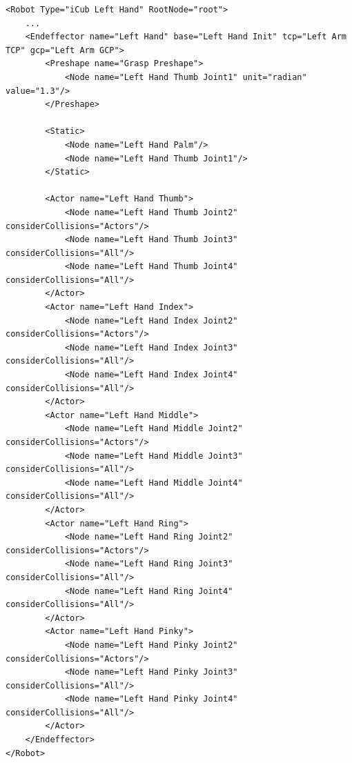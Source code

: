 \documentclass{book}
\begin{document}
\begin{lstlisting}
<Robot Type="iCub Left Hand" RootNode="root">
    ...
    <Endeffector name="Left Hand" base="Left Hand Init" tcp="Left Arm TCP" gcp="Left Arm GCP">
        <Preshape name="Grasp Preshape">
            <Node name="Left Hand Thumb Joint1" unit="radian" value="1.3"/>
        </Preshape>

        <Static>
            <Node name="Left Hand Palm"/>
            <Node name="Left Hand Thumb Joint1"/>
        </Static>

        <Actor name="Left Hand Thumb">
            <Node name="Left Hand Thumb Joint2" considerCollisions="Actors"/>
            <Node name="Left Hand Thumb Joint3" considerCollisions="All"/>
            <Node name="Left Hand Thumb Joint4" considerCollisions="All"/>
        </Actor>
        <Actor name="Left Hand Index">
            <Node name="Left Hand Index Joint2" considerCollisions="Actors"/>
            <Node name="Left Hand Index Joint3" considerCollisions="All"/>
            <Node name="Left Hand Index Joint4" considerCollisions="All"/>
        </Actor>
        <Actor name="Left Hand Middle">
            <Node name="Left Hand Middle Joint2" considerCollisions="Actors"/>
            <Node name="Left Hand Middle Joint3" considerCollisions="All"/>
            <Node name="Left Hand Middle Joint4" considerCollisions="All"/>
        </Actor>
        <Actor name="Left Hand Ring">
            <Node name="Left Hand Ring Joint2" considerCollisions="Actors"/>
            <Node name="Left Hand Ring Joint3" considerCollisions="All"/>
            <Node name="Left Hand Ring Joint4" considerCollisions="All"/>
        </Actor>
        <Actor name="Left Hand Pinky">
            <Node name="Left Hand Pinky Joint2" considerCollisions="Actors"/>
            <Node name="Left Hand Pinky Joint3" considerCollisions="All"/>
            <Node name="Left Hand Pinky Joint4" considerCollisions="All"/>
        </Actor>
    </Endeffector>
</Robot>
\end{lstlisting}
\par
\end{document}
